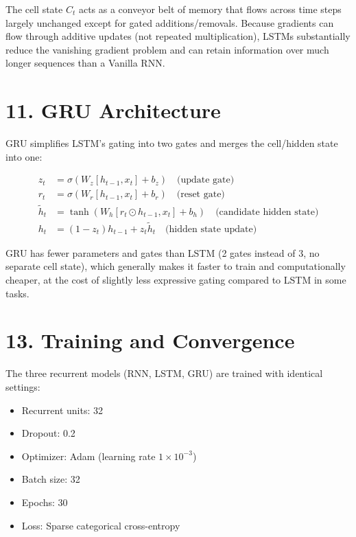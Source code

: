 \documentclass[10pt]{article}
\begin{document}
The cell state $C_t$ acts as a conveyor belt of memory that flows across time steps largely unchanged 
except for gated additions/removals. Because gradients can flow through additive updates (not repeated 
multiplication), LSTMs substantially reduce the vanishing gradient problem and can retain information 
over much longer sequences than a Vanilla RNN.

\section*{11. GRU Architecture}

GRU simplifies LSTM's gating into two gates and merges the cell/hidden state into one:

\begin{align*}
z_t &= \sigma(W_z[h_{t-1}, x_t] + b_z) \quad \text{(update gate)}\\
r_t &= \sigma(W_r[h_{t-1}, x_t] + b_r) \quad \text{(reset gate)}\\
\tilde{h}_t &= \tanh(W_h[r_t \odot h_{t-1}, x_t] + b_h) \quad \text{(candidate hidden state)}\\
h_t &= (1-z_t)h_{t-1} + z_t \tilde{h}_t \quad \text{(hidden state update)}
\end{align*}

GRU has fewer parameters and gates than LSTM (2 gates instead of 3, no separate cell state), 
which generally makes it faster to train and computationally cheaper, at the cost of slightly 
less expressive gating compared to LSTM in some tasks.

\section*{13. Training and Convergence}

The three recurrent models (RNN, LSTM, GRU) are trained with identical settings:
\begin{itemize}
\item Recurrent units: 32
\item Dropout: 0.2
\item Optimizer: Adam (learning rate $1 \times 10^{-3}$)
\item Batch size: 32
\item Epochs: 30
\item Loss: Sparse categorical cross-entropy
\end{itemize}
\end{document}
